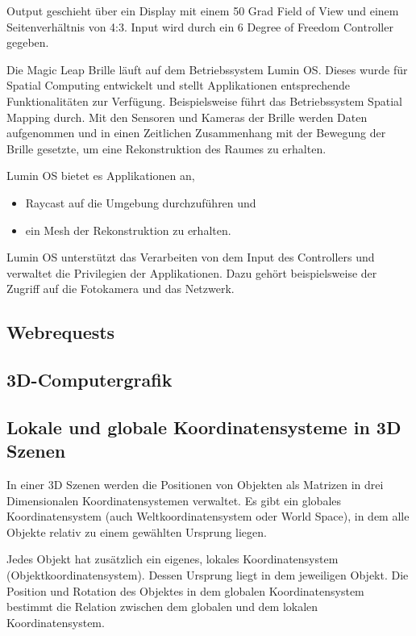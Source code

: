 \documentclass[german,a4paper, 12pt]{llncs}
\begin{document}
Output geschieht über ein Display mit einem 50 Grad Field of View und einem Seitenverhältnis von 4:3. 
Input wird durch ein 6 Degree of Freedom Controller gegeben.\cite{mlofficialsalespitch,mlglossary}

Die Magic Leap Brille läuft auf dem Betriebssystem Lumin OS. Dieses wurde für Spatial Computing entwickelt und stellt Applikationen entsprechende Funktionalitäten zur Verfügung.
Beispielsweise führt das Betriebssystem Spatial Mapping durch. Mit den Sensoren und Kameras der Brille werden Daten aufgenommen und in einen Zeitlichen Zusammenhang mit der Bewegung der Brille gesetzte, um eine Rekonstruktion des Raumes zu erhalten.\cite{mlluminOS,mlluminfeatures,mlluminworldreconstruktion,mlmeshingunity}

Lumin OS bietet es Applikationen an,
\begin{itemize}
	\item Raycast auf die Umgebung durchzuführen und
	\item ein Mesh der Rekonstruktion zu erhalten.
\end{itemize}

Lumin OS unterstützt das Verarbeiten von dem Input des Controllers und verwaltet die Privilegien der Applikationen. Dazu gehört beispielsweise der Zugriff auf die Fotokamera und das Netzwerk.\cite{mlluminfeatures,mlappsecurity}
\subsection{Webrequests}


\subsection*{3D-Computergrafik}
\subsection{Lokale und globale Koordinatensysteme in 3D Szenen}

In einer 3D Szenen werden die Positionen von Objekten als Matrizen in drei Dimensionalen Koordinatensystemen verwaltet.
Es gibt ein globales Koordinatensystem (auch Weltkoordinatensystem oder World Space), in dem alle Objekte relativ zu einem gewählten Ursprung liegen. 

Jedes Objekt hat zusätzlich ein eigenes, lokales Koordinatensystem (Objektkoordinatensystem). Dessen Ursprung liegt in dem jeweiligen Objekt.
Die Position und Rotation des Objektes in dem globalen Koordinatensystem bestimmt die Relation zwischen dem globalen und dem lokalen Koordinatensystem. 
\end{document}
